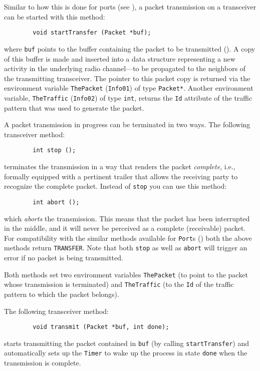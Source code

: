 Similar to how this is done for ports (see ),
a packet transmission on a transceiver can be started with this 
method:
\begin{verbatim}
        void startTransfer (Packet *buf);
\end{verbatim}
where {\tt buf} points to the buffer
containing the packet to be transmitted ().
A copy of this buffer is made and inserted into a data structure representing
a new activity in the underlying radio channel---to be propagated to the
neighbors of the transmitting transceiver.
The pointer to this packet copy is returned via the environment
variable {\tt ThePacket} ({\tt Info01}) of type {\tt Packet*}.
Another environment variable, {\tt TheTraffic} ({\tt Info02}) of type
{\tt int}, returns the {\tt Id} attribute of the traffic pattern that was
used to generate the packet.

A packet transmission in progress can be terminated in two ways.
The following transceiver method:
\begin{verbatim}
        int stop ();
\end{verbatim}
\noindent
terminates the transmission in a way that renders the
packet {\em complete}, i.e., formally
equipped with a pertinent trailer that allows the receiving party to
recognize the complete packet.
Instead of {\tt stop} you can use this method:
\begin{verbatim}
        int abort ();
\end{verbatim}
which {\em aborts\/} the transmission.
This means that the packet has been interrupted in the middle,
and it will never be perceived as a complete (receivable) packet.
For compatibility with the similar methods available for {\tt Port}s
() both the above methods return {\tt TRANSFER}.
Note that both {\tt stop} as well as {\tt abort} will trigger an error
if no packet is being transmitted.

Both methods set two environment variables {\tt ThePacket}
(to point to the packet whose transmission is terminated)
and {\tt TheTraffic} (to the
{\tt Id} of the traffic pattern to which the packet belongs).

\medskip

The following transceiver method:
\begin{verbatim}
        void transmit (Packet *buf, int done);
\end{verbatim}
starts transmitting the packet contained in {\tt buf} (by calling
{\tt startTransfer}) and automatically
sets up the {\tt Timer} to wake up the process in state {\tt done} when the
transmission is complete.


